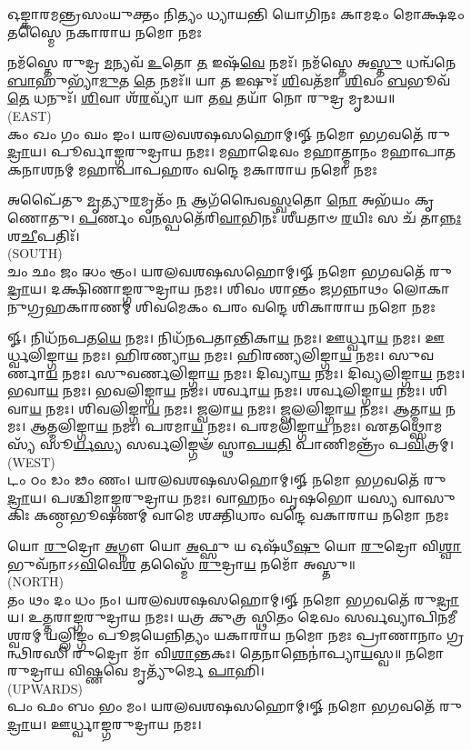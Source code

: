 


\twolineshloka
{𑌓𑌙𑍍𑌕𑌾𑌰𑌮𑌨𑍍𑌤𑍍𑌰𑌸𑌂𑌯𑍁𑌕𑍍𑌤𑌂 𑌨𑌿𑌤𑍍𑌯𑌂 𑌧𑍍𑌯𑌾𑌯𑌨𑍍𑌤𑌿 𑌯𑍋𑌗𑌿𑌨𑌃}
{𑌕𑌾𑌮𑌦𑌂 𑌮𑍋𑌕𑍍𑌷𑌦𑌂 𑌤𑌸𑍍𑌮𑍈 𑌨𑌕𑌾𑌰𑌾𑌯 𑌨𑌮𑍋 𑌨𑌮𑌃}

𑌨𑌮᳴𑌸𑍍𑌤𑍇 𑌰𑍁𑌦𑍍𑌰 \ul{𑌮}\-𑌨𑍍𑌯𑌵᳴ \ul{𑌉}\-𑌤𑍋 \ul{𑌤} 𑌇𑌷᳴\-\ul{𑌵𑍇} 𑌨𑌮𑌃᳴। 𑌨𑌮᳴𑌸𑍍𑌤𑍇 𑌅\-\ul{𑌸𑍍𑌤𑍁} 𑌧𑌨𑍍𑌵᳴𑌨𑍇 \ul{𑌬𑌾}\-𑌹𑍁𑌭𑍍𑌯𑌾᳴\-\ul{𑌮𑍁}\-𑌤 \ul{𑌤𑍇} 𑌨𑌮𑌃᳴॥ 𑌯𑌾 \ul{𑌤} 𑌇𑌷𑍁𑌃᳴ \ul{𑌶𑌿}\-𑌵𑌤᳴𑌮𑌾 \ul{𑌶𑌿}\-𑌵𑌂 \ul{𑌬}\-𑌭𑍂𑌵᳴ \ul{𑌤𑍇} 𑌧𑌨𑍁𑌃᳴। \ul{𑌶𑌿}\-𑌵𑌾 𑌶᳴\-\ul{𑌰}\-𑌵𑍍𑌯𑌾᳴ 𑌯𑌾 𑌤\-\ul{𑌵} 𑌤𑌯𑌾᳴ 𑌨𑍋 𑌰𑍁𑌦𑍍𑌰 𑌮𑍃𑌡𑌯॥\\
{\scriptsize (EAST)}\\
𑌕𑌂 𑌖𑌂 𑌗𑌂 𑌘𑌂 𑌙𑌂। 𑌯𑌰𑌲𑌵𑌶𑌷𑌸𑌹𑍋𑌮𑍍।𑍐 𑌨𑌮𑍋 𑌭𑌗𑌵𑌤𑍇᳴ 𑌰𑍁\-\ul{𑌦𑍍𑌰𑌾}\-𑌯। 𑌪𑍂𑌰𑍍𑌵𑌾𑌙𑍍𑌗𑌰𑍁𑌦𑍍𑌰𑌾𑌯 𑌨𑌮𑌃। 
\medskip
\twolineshloka
{𑌮𑌹𑌾𑌦𑍇𑌵𑌂 𑌮𑌹𑌾𑌤𑍍𑌮𑌾𑌨𑌂 𑌮𑌹𑌾𑌪𑌾𑌤𑌕𑌨𑌾𑌶𑌨𑌮𑍍}
{𑌮𑌹𑌾𑌪𑌾𑌪𑌹𑌰𑌂 𑌵𑌨𑍍𑌦𑍇 𑌮𑌕𑌾𑌰𑌾𑌯 𑌨𑌮𑍋 𑌨𑌮𑌃}

𑌅𑌪𑍈᳴𑌤𑍁 \ul{𑌮𑍃}\-𑌤𑍍𑌯𑍁\-\ul{𑌰}\-𑌮𑍃𑌤𑌂᳴ \ul{𑌨} 𑌆𑌗᳴𑌨𑍍𑌵𑍈𑌵\-\ul{𑌸𑍍𑌵}\-𑌤𑍋 \ul{𑌨𑍋} 𑌅𑌭᳴𑌯𑌂 𑌕𑍃𑌣𑍋𑌤𑍁।
\-\ul{𑌪}\-𑌰𑍍𑌣𑌂 𑌵\-\ul{𑌨}\-𑌸𑍍𑌪𑌤𑍇᳴𑌰𑌿\-\ul{𑌵𑌾}\-𑌭𑌿𑌨𑌃᳴ 𑌶𑍀𑌯𑌤𑌾𑍞 \ul{𑌰}\-𑌯𑌿𑌃 𑌸 𑌚᳴ 𑌤𑌾\-\ul{𑌨𑍍𑌨𑌃} 𑌶\-\ul{𑌚𑍀}\-𑌪𑌤𑌿𑌃᳴।\\
{\scriptsize (SOUTH)}\\
𑌚𑌂 𑌛𑌂 𑌜𑌂 𑌝𑌂 𑌞𑌂। 𑌯𑌰𑌲𑌵𑌶𑌷𑌸𑌹𑍋𑌮𑍍।𑍐 𑌨𑌮𑍋 𑌭𑌗𑌵𑌤𑍇᳴ 𑌰𑍁\-\ul{𑌦𑍍𑌰𑌾}\-𑌯। 𑌦𑌕𑍍𑌷𑌿𑌣𑌾𑌙𑍍𑌗𑌰𑍁𑌦𑍍𑌰𑌾𑌯 𑌨𑌮𑌃।
\medskip
\twolineshloka
{𑌶𑌿𑌵𑌂 𑌶𑌾𑌨𑍍𑌤𑌂 𑌜𑌗𑌨𑍍𑌨𑌾𑌥𑌂 𑌲𑍋𑌕𑌾𑌨𑍁𑌗𑍍𑌰𑌹𑌕𑌾𑌰𑌣𑌮𑍍}
{𑌶𑌿𑌵𑌮𑍇𑌕𑌂 𑌪𑌰𑌂 𑌵𑌨𑍍𑌦𑍇 𑌶𑌿𑌕𑌾𑌰𑌾𑌯 𑌨𑌮𑍋 𑌨𑌮𑌃}

𑍐। 𑌨𑌿𑌧᳴𑌨𑌪𑌤\-\ul{𑌯𑍇} 𑌨𑌮𑌃। 𑌨𑌿𑌧᳴𑌨𑌪𑌤𑌾𑌨𑍍𑌤𑌿𑌕𑌾\-\ul{𑌯} 𑌨𑌮𑌃। 𑌊𑌰𑍍𑌧𑍍𑌵𑌾\-\ul{𑌯} 𑌨𑌮𑌃। 𑌊𑌰𑍍𑌧𑍍𑌵𑌲𑌿𑌙𑍍𑌗𑌾\-\ul{𑌯} 𑌨𑌮𑌃। 𑌹𑌿𑌰𑌣𑍍𑌯𑌾\-\ul{𑌯} 𑌨𑌮𑌃। 𑌹𑌿𑌰𑌣𑍍𑌯𑌲𑌿𑌙𑍍𑌗𑌾\-\ul{𑌯} 𑌨𑌮𑌃। 𑌸𑍁𑌵𑌰𑍍𑌣𑌾\-\ul{𑌯} 𑌨𑌮𑌃। 𑌸𑍁𑌵𑌰𑍍𑌣𑌲𑌿𑌙𑍍𑌗𑌾\-\ul{𑌯} 𑌨𑌮𑌃। 𑌦𑌿𑌵𑍍𑌯𑌾\-\ul{𑌯} 𑌨𑌮𑌃। 𑌦𑌿𑌵𑍍𑌯𑌲𑌿𑌙𑍍𑌗𑌾\-\ul{𑌯} 𑌨𑌮𑌃। 𑌭𑌵𑌾\-\ul{𑌯} 𑌨𑌮𑌃। 𑌭𑌵𑌲𑌿𑌙𑍍𑌗𑌾\-\ul{𑌯} 𑌨𑌮𑌃। 𑌶𑌰𑍍𑌵𑌾\-\ul{𑌯} 𑌨𑌮𑌃। 𑌶𑌰𑍍𑌵𑌲𑌿𑌙𑍍𑌗𑌾\-\ul{𑌯} 𑌨𑌮𑌃। 𑌶𑌿𑌵𑌾\-\ul{𑌯} 𑌨𑌮𑌃। 𑌶𑌿𑌵𑌲𑌿𑌙𑍍𑌗𑌾\-\ul{𑌯} 𑌨𑌮𑌃। 𑌜𑍍𑌵𑌲𑌾\-\ul{𑌯} 𑌨𑌮𑌃। 𑌜𑍍𑌵𑌲𑌲𑌿𑌙𑍍𑌗𑌾\-\ul{𑌯} 𑌨𑌮𑌃। 𑌆𑌤𑍍𑌮𑌾\-\ul{𑌯} 𑌨𑌮𑌃। 𑌆𑌤𑍍𑌮𑌲𑌿𑌙𑍍𑌗𑌾\-\ul{𑌯} 𑌨𑌮𑌃। 𑌪𑌰𑌮𑌾\-\ul{𑌯} 𑌨𑌮𑌃। 𑌪𑌰𑌮𑌲𑌿𑌙𑍍𑌗𑌾\-\ul{𑌯} 𑌨𑌮𑌃। 𑌏𑌤𑌥𑍍𑌸𑍋𑌮𑌸𑍍𑌯᳴ 𑌸𑍂\-\ul{𑌰𑍍𑌯}\-\-\ul{𑌸𑍍𑌯} 𑌸𑌰𑍍𑌵𑌲𑌿𑌙𑍍𑌗𑍟᳴ 𑌸𑍍𑌥𑌾\-\ul{𑌪}\-\-\ul{𑌯}\-\-\ul{𑌤𑌿} 𑌪𑌾𑌣𑌿𑌮𑌨𑍍𑌤𑍍𑌰𑌂᳴ 𑌪\-\ul{𑌵𑌿}\-𑌤𑍍𑌰𑌮𑍍।\\
{\scriptsize (WEST)}\\
𑌟𑌂 𑌠𑌂 𑌡𑌂 𑌢𑌂 𑌣𑌂। 𑌯𑌰𑌲𑌵𑌶𑌷𑌸𑌹𑍋𑌮𑍍।𑍐 𑌨𑌮𑍋 𑌭𑌗𑌵𑌤𑍇᳴ 𑌰𑍁\-\ul{𑌦𑍍𑌰𑌾}\-𑌯। 𑌪𑌶𑍍𑌚𑌿𑌮𑌾𑌙𑍍𑌗𑌰𑍁𑌦𑍍𑌰𑌾𑌯 𑌨𑌮𑌃।
\medskip
\twolineshloka
{𑌵𑌾𑌹𑌨𑌂 𑌵𑍃𑌷𑌭𑍋 𑌯𑌸𑍍𑌯 𑌵𑌾𑌸𑍁𑌕𑌿𑌃 𑌕𑌣𑍍𑌠𑌭𑍂𑌷𑌣𑌮𑍍}
{𑌵𑌾𑌮𑍇 𑌶𑌕𑍍𑌤𑌿𑌧𑌰𑌂 𑌵𑌨𑍍𑌦𑍇 𑌵𑌕𑌾𑌰𑌾𑌯 𑌨𑌮𑍋 𑌨𑌮𑌃}

𑌯𑍋 \ul{𑌰𑍁}\-𑌦𑍍𑌰𑍋 \ul{𑌅}\-𑌗𑍍𑌨𑍗 𑌯𑍋 \ul{𑌅}\-𑌫𑍍𑌸𑍁 𑌯 𑌓𑌷᳴𑌧𑍀\-\ul{𑌷𑍁} 𑌯𑍋 \ul{𑌰𑍁}\-𑌦𑍍𑌰𑍋 𑌵𑌿\-\ul{𑌶𑍍𑌵𑌾} 𑌭𑍁𑌵᳴𑌨𑌾𑌽𑌽\-\ul{𑌵𑌿}\-𑌵𑍇\-\ul{𑌶} 𑌤𑌸𑍍𑌮𑍈᳴ \ul{𑌰𑍁}\-𑌦𑍍𑌰𑌾\-\ul{𑌯} 𑌨𑌮𑍋᳴ 𑌅𑌸𑍍𑌤𑍁॥ \\
{\scriptsize (NORTH)}\\
𑌤𑌂 𑌥𑌂 𑌦𑌂 𑌧𑌂 𑌨𑌂। 𑌯𑌰𑌲𑌵𑌶𑌷𑌸𑌹𑍋𑌮𑍍।𑍐 𑌨𑌮𑍋 𑌭𑌗𑌵𑌤𑍇᳴ 𑌰𑍁\-\ul{𑌦𑍍𑌰𑌾}\-𑌯। 𑌉𑌤𑍍𑌤𑌰𑌾𑌙𑍍𑌗𑌰𑍁𑌦𑍍𑌰𑌾𑌯 𑌨𑌮𑌃।
\medskip
\twolineshloka
{𑌯𑌤𑍍𑌰 𑌕𑍁𑌤𑍍𑌰 𑌸𑍍𑌥𑌿𑌤𑌂 𑌦𑍇𑌵𑌂 𑌸𑌰𑍍𑌵𑌵𑍍𑌯𑌾𑌪𑌿𑌨𑌮𑍀𑌶𑍍𑌵𑌰𑌮𑍍}
{𑌯𑌲𑍍𑌲𑌿𑌙𑍍𑌗𑌂 𑌪𑍂𑌜𑌯𑍇𑌨𑍍𑌨𑌿𑌤𑍍𑌯𑌂 𑌯𑌕𑌾𑌰𑌾𑌯 𑌨𑌮𑍋 𑌨𑌮𑌃}
𑌪𑍍𑌰𑌾𑌣𑌾𑌨𑌾𑌂 𑌗𑍍𑌰𑌨𑍍𑌥𑌿𑌰𑌸𑌿 𑌰𑍁𑌦𑍍𑌰𑍋 𑌮𑌾᳴ 𑌵𑌿\-\ul{𑌶𑌾}\-𑌨𑍍𑌤𑌕𑌃। 𑌤𑍇𑌨𑌾𑌨𑍍𑌨𑍇𑌨𑌾॑𑌪𑍍𑌯𑌾\-\ul{𑌯}\-𑌸𑍍𑌵॥ 𑌨𑌮𑍋 𑌰𑍁𑌦𑍍𑌰𑌾𑌯 𑌵𑌿𑌷𑍍𑌣𑌵𑍇 𑌮𑍃𑌤𑍍𑌯𑍁᳴𑌰𑍍𑌮𑍇 \ul{𑌪𑌾}\-𑌹𑌿।\\
{\scriptsize (UPWARDS)}\\
𑌪𑌂 𑌫𑌂 𑌬𑌂 𑌭𑌂 𑌮𑌂। 𑌯𑌰𑌲𑌵𑌶𑌷𑌸𑌹𑍋𑌮𑍍।𑍐 𑌨𑌮𑍋 𑌭𑌗𑌵𑌤𑍇᳴ 𑌰𑍁\-\ul{𑌦𑍍𑌰𑌾}\-𑌯। 𑌊𑌰𑍍𑌧𑍍𑌵𑌾𑌙𑍍𑌗𑌰𑍁𑌦𑍍𑌰𑌾𑌯 𑌨𑌮𑌃।

